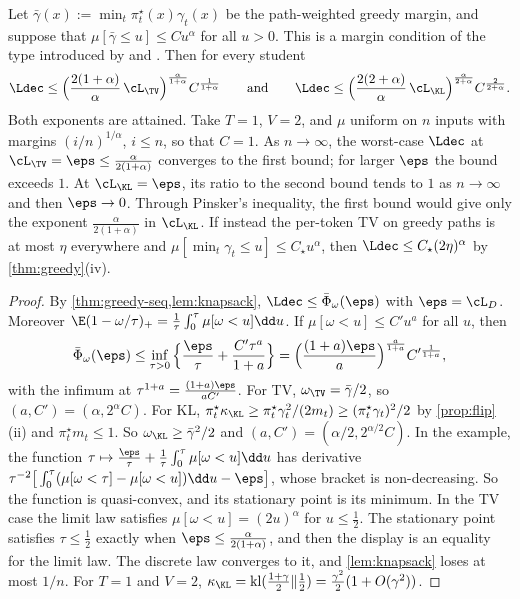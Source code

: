 \begin{corollary}\label{cor:rates}
\Pv\Ck Let $\bar\gamma(x):=\min_t\pi^\star_t(x)\gamma_t(x)$ be the path-weighted greedy margin, and suppose that
$\mu[\bar\gamma\le u]\le Cu^\alpha$ for all $u>0$. This is a margin condition of the type introduced by
\citet{mammen1999smooth} and \citet{tsybakov2004optimal}. Then for every student
\[
\Ldec\le\Big(\frac{2(1+\alpha)}{\alpha}\,\cL_{\TV}\Big)^{\frac\alpha{1+\alpha}}C^{\frac1{1+\alpha}}
\qquad\text{and}\qquad
\Ldec\le\Big(\frac{2(2+\alpha)}{\alpha}\,\cL_{\KL}\Big)^{\frac\alpha{2+\alpha}}C^{\frac2{2+\alpha}}.
\]
Both exponents are attained. Take $T=1$, $V=2$, and $\mu$ uniform on $n$ inputs with margins $(i/n)^{1/\alpha}$,
$i\le n$, so that $C=1$. As $n\to\infty$, the worst-case $\Ldec$ at $\cL_{\TV}=\eps\le\frac{\alpha}{2(1+\alpha)}$ converges to
the first bound; for larger $\eps$ the bound exceeds $1$.
At $\cL_{\KL}=\eps$, its ratio to the second bound tends to $1$ as $n\to\infty$ and then $\eps\to0$. Through
Pinsker's inequality, the first bound would give only the exponent $\frac\alpha{2(1+\alpha)}$ in $\cL_{\KL}$. If instead
the per-token TV on greedy paths is at most $\eta$ everywhere and $\mu[\min_t\gamma_t\le u]\le C_\star u^\alpha$, then
$\Ldec\le C_\star(2\eta)^\alpha$ by \cref{thm:greedy}(iv).
\end{corollary}
\begin{proof}
By \cref{thm:greedy-seq,lem:knapsack}, $\Ldec\le\bar\Phi_\omega(\eps)$ with $\eps=\cL_{D}$. Moreover
$\E(1-\omega/\tau)_+=\frac1\tau\int_0^\tau\mu[\omega<u]\dd u$. If $\mu[\omega<u]\le C'u^a$ for all $u$, then
\[
\bar\Phi_\omega(\eps)\le\inf_{\tau>0}\Big\{\frac\eps\tau+\frac{C'\tau^a}{1+a}\Big\}=\Big(\frac{(1+a)\eps}{a}\Big)^{\frac a{1+a}}C'^{\frac1{1+a}},
\]
with the infimum at $\tau^{1+a}=\frac{(1+a)\eps}{aC'}$. For TV, $\omega_{\TV}=\bar\gamma/2$, so $(a,C')=(\alpha,2^\alpha C)$. For KL,
$\pi^\star_t\kappa_{\KL}\ge\pi^\star_t\gamma_t^2/(2m_t)\ge(\pi^\star_t\gamma_t)^2/2$ by \cref{prop:flip}(ii) and $\pi^\star_tm_t\le1$. So
$\omega_{\KL}\ge\bar\gamma^2/2$ and $(a,C')=(\alpha/2,2^{\alpha/2}C)$. In the example, the function
$\tau\mapsto\frac\eps\tau+\frac1\tau\int_0^\tau\mu[\omega<u]\dd u$ has derivative
$\tau^{-2}\big[\int_0^\tau(\mu[\omega<\tau]-\mu[\omega<u])\dd u-\eps\big]$, whose bracket is non-decreasing. So the function is
quasi-convex, and its stationary point is its minimum. In the TV case the limit law satisfies
$\mu[\omega<u]=(2u)^\alpha$ for $u\le\frac12$. The stationary point satisfies $\tau\le\frac12$ exactly when
$\eps\le\frac\alpha{2(1+\alpha)}$, and then the display is an equality for the limit law. The discrete law converges to it,
and \cref{lem:knapsack} loses at most $1/n$. For
$T=1$ and $V=2$, $\kappa_{\KL}=\mathrm{kl}(\frac{1+\gamma}2\|\frac12)=\frac{\gamma^2}2(1+O(\gamma^2))$.
\end{proof}

